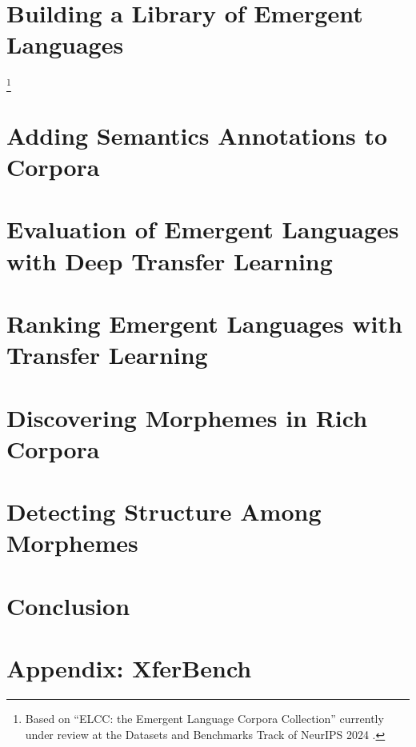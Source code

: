 \newpage
\tableofcontents*



\chapter{Building a Library of Emergent Languages }

\footnote{Based on ``ELCC: the Emergent Language Corpora Collection'' currently under review at the Datasets and Benchmarks Track of NeurIPS 2024 .}


\chapter{Adding Semantics Annotations to Corpora }
\unskip\label{ch:rich-corpora}




\chapter{Evaluation of Emergent Languages with Deep Transfer Learning}



\chapter{Ranking Emergent Languages with Transfer Learning }
\unskip\label{ch:xferbench-analysis}



\chapter{Discovering Morphemes in Rich Corpora }
\unskip\label{ch:universals}



\chapter{Detecting Structure Among Morphemes }
\unskip\label{ch:syntax}




\chapter{Conclusion}




\appendix

\chapter{Appendix: XferBench}



